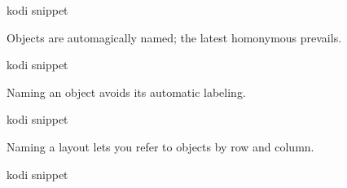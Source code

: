 
\begin{tcblisting}{kodi snippet}
\end{tcblisting}

Objects are automagically named; the latest homonymous prevails.

\begin{tcblisting}{kodi snippet}
\end{tcblisting}

Naming an object avoids its automatic labeling.

\begin{tcblisting}{kodi snippet}
\end{tcblisting}

Naming a layout lets you refer to objects by row and column.

\begin{tcblisting}{kodi snippet}
\end{tcblisting}

